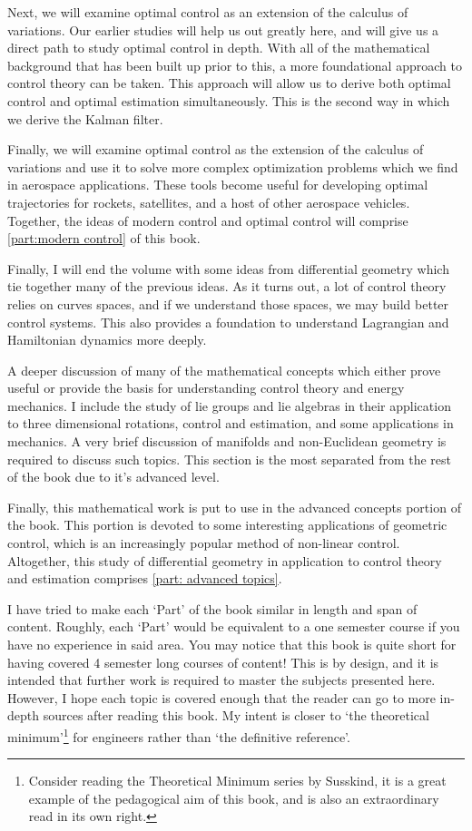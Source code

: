 Next, we will examine optimal control as an extension of the calculus of variations. Our earlier studies will help us out greatly here, and will give us a direct path to study optimal control in depth. With all of the mathematical background that has been built up prior to this, a more foundational approach to control theory can be taken. This approach will allow us to derive both optimal control and optimal estimation simultaneously. This is the second way in which we derive the Kalman filter.

Finally, we will examine optimal control as the extension of the calculus of variations and use it to solve more complex optimization problems which we find in aerospace applications. These tools become useful for developing optimal trajectories for rockets, satellites, and a host of other aerospace vehicles. Together, the ideas of modern control and optimal control will comprise \autoref{part:modern control} of this book.

Finally, I will end the volume with some ideas from differential geometry which tie together many of the previous ideas. As it turns out, a lot of control theory relies on curves spaces, and if we understand those spaces, we may build better control systems. This also provides a foundation to understand Lagrangian and Hamiltonian dynamics more deeply.

A deeper discussion of many of the mathematical concepts which either prove useful or provide the basis for understanding control theory and energy mechanics. I include the study of \glspl{lie group} and \glspl{lie algebra} in their application to three dimensional rotations, control and estimation, and some applications in mechanics. A very brief discussion of manifolds and non-Euclidean geometry is required to discuss such topics. This section is the most separated from the rest of the book due to it's advanced level.

Finally, this mathematical work is put to use in the advanced concepts portion of the book. This portion is devoted to some interesting applications of geometric control, which is an increasingly popular method of non-linear control. Altogether, this study of differential geometry in application to control theory and estimation comprises \autoref{part: advanced topics}.

I have tried to make each `Part' of the book similar in length and span of content. Roughly, each `Part' would be equivalent to a one semester course if you have no experience in said area. You may notice that this book is quite short for having covered 4 semester long courses of content! This is by design, and it is intended that further work is required to master the subjects presented here. However, I hope each topic is covered enough that the reader can go to more in-depth sources after reading this book. My intent is closer to `the theoretical minimum'\footnote{Consider reading the Theoretical Minimum series by Susskind, it is a great example of the pedagogical aim of this book, and is also an extraordinary read in its own right.} for engineers rather than `the definitive reference'.

